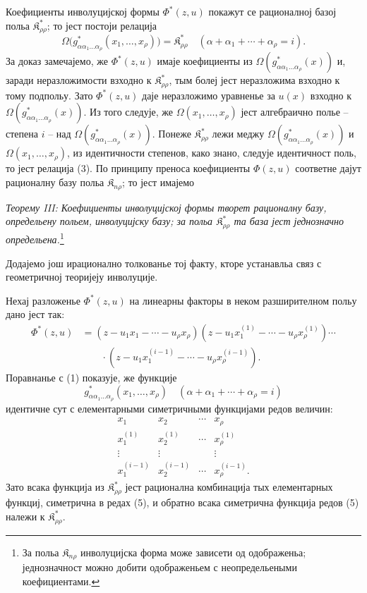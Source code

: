 ﻿\documentclass[11pt]{article}
\providecommand{\Kfield}{\mathfrak{K}}
\begin{document}
Коефициенты инволуцијској формы $\Phi^*(z,u)$ покажут се рационалној базој польа $\Kfield^*_{\rho\rho}$; то јест постоји релација
\begin{equation}
  \Omega\bigl(g^*_{\alpha\alpha_1\ldots\alpha_\rho}(x_1,
  \ldots,x_\rho)\bigr)=\Kfield^*_{\rho\rho}
  \quad(\alpha+\alpha_1+\cdots+\alpha_\rho=i).
\tag{3}
\end{equation}
За доказ замечајемо, же $\Phi^*(z,u)$ имаје коефициенты из $\Omega(g^*_{\alpha\alpha_1\ldots\alpha_\rho}(x))$ и, заради неразложимости взходно к $\Kfield^*_{\rho\rho}$, тым болеј јест неразложима взходно к тому подпольу. Зато $\Phi^*(z,u)$ даје неразложимо уравненье за $u(x)$ взходно к $\Omega(g^*_{\alpha\alpha_1\ldots\alpha_\rho}(x))$. Из того следује, же $\Omega(x_1,\ldots,x_\rho)$ јест алгебраично полье -- степена $i$ -- над $\Omega(g^*_{\alpha\alpha_1\ldots\alpha_\rho}(x))$. Понеже $\Kfield^*_{\rho\rho}$ лежи меджу $\Omega(g^*_{\alpha\alpha_1\ldots\alpha_\rho}(x))$ и $\Omega(x_1,\ldots,x_\rho)$, из идентичности степенов, како знано, следује идентичност поль, то јест релација (3). По принципу преноса коефициенты $\Phi(z,u)$ соответне дајут рационалну базу польа $\Kfield_{n\rho}$; то јест имајемо

{\itshape Теорему III: Коефициенты инволуцијској формы творет рационалну базу, определьену польем, инволуцијску базу; за польа $\Kfield^*_{\rho\rho}$ та база јест једнозначно определьена.}\footnote{За польа $\Kfield_{n\rho}$ инволуцијска форма може зависети од одображеньа; једнозначност можно добити одображеньем с неопредельеными коефициентами.}

Додајемо још ирационално толкованье тој факту, кторе устанавльа связ с геометричној теоријеју инволуције.

Нехај разложенье $\Phi^*(z,u)$ на линеарны факторы в неком разширителном польу дано јест так:
\begin{equation}
\begin{aligned}
 \Phi^*(z,u)&=(z-u_1x_1-\cdots-u_\rho x_\rho)
 (z-u_1x_1^{(1)}-\cdots-u_\rho x_\rho^{(1)})\cdots\\
 &\qquad\cdot
 (z-u_1x_1^{(i-1)}-\cdots-u_\rho x_\rho^{(i-1)}).
\end{aligned}
\tag{4}
\end{equation}
Поравнанье с (1) показује, же функције
\[
  g^*_{\alpha\alpha_1\ldots\alpha_\rho}(x_1,
  \ldots,x_\rho)\quad(\alpha+\alpha_1+\cdots+\alpha_\rho=i)
\]
идентичне сут с елементарными симетричными функцијами редов величин:
\begin{equation}
\begin{array}{cccc}
  x_1 & x_2 & \cdots & x_\rho\\
  x_1^{(1)} & x_2^{(1)} & \cdots & x_\rho^{(1)}\\
  \vdots & \vdots & & \vdots\\
  x_1^{(i-1)} & x_2^{(i-1)} & \cdots & x_\rho^{(i-1)}.
\end{array}
\tag{5}
\end{equation}
Зато всака функција из $\Kfield^*_{\rho\rho}$ јест рационална комбинација тых елементарных функциј, симетрична в редах (5), и обратно всака симетрична функција редов (5) належи к $\Kfield^*_{\rho\rho}$.
\end{document}
